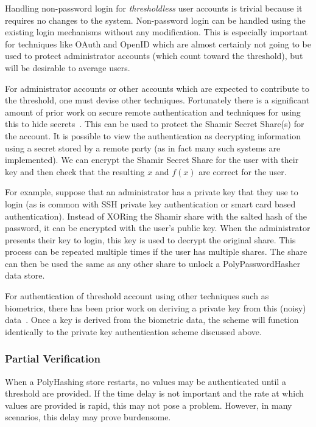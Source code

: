 Handling non-password login for \emph{thresholdless} user accounts is trivial 
because
it requires no changes to the system.   Non-password login can be handled 
using the existing login mechanisms without any modification.
This is especially important for techniques like OAuth and OpenID which 
are almost certainly not going to be used to protect administrator accounts
(which count toward the threshold), but will be desirable to average users.

For administrator accounts or other accounts which are expected to contribute
to the threshold, one must devise other techniques.   Fortunately there is
a significant amount of prior work on secure remote authentication and
techniques for using this to hide 
secrets~\cite{deo1998authentication, yang1999password}.   This can be used to 
protect the Shamir Secret Share(s) for the account.
It is possible to view the authentication as decrypting information using a 
secret stored by a remote party (as in fact many such systems are implemented).
We can encrypt the Shamir Secret Share for the user with their key and then
check that the resulting $x$ and $f(x)$ are correct for the user.   

For example, suppose that an administrator has a private key that they use
to login (as is common with SSH private key authentication or smart card
based authentication).   Instead of
XORing the Shamir share with the salted hash of the password, it can
be encrypted with the user's public key.   When the administrator presents
their key to login, this key is used to decrypt the original share.   This
process can be repeated multiple times if the user has multiple shares.
 The share can then be used the same as any other share to 
unlock a PolyPasswordHasher data store.


For authentication of threshold account using other techniques such as 
biometrics, there has been prior work on deriving a private key from this 
(noisy) data~\cite{juels2006fuzzy}.   Once a key is derived from the biometric 
data, the scheme will function identically to the private key authentication 
scheme discussed above.




\subsubsection{Partial Verification}
\label{sec-partial}

When a PolyHashing store restarts, no values may be authenticated until a
threshold are provided.   If the time delay is not important and the rate
at which values are provided is rapid, this may not pose a problem.   However,
in many scenarios, this delay may prove burdensome.

